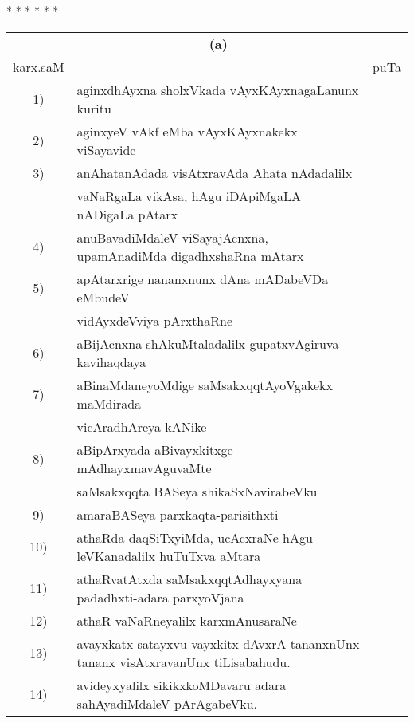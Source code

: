 {\begin{center}
* * * * * *
\end{center}



\begin{longtable}{@{}cp{7.4cm}r}
   &      \multicolumn{1}{c}{\textbf{(a)}} & \\[0.5cm]
karx.saM &                                             & puTa\\[0.5cm]
1) & aginxdhAyxna sholxVkada vAyxKAyxnagaLanunx kuritu & \pageref{page208}\\
2) & aginxyeV vAkf eMba vAyxKAyxnakekx viSayavide & \pageref{page211}\\
3) & anAhatanAdada visAtxravAda Ahata nAdadalilx  & \\
   & vaNaRgaLa vikAsa, hAgu iDApiMgaLA nADigaLa pAtarx & \pageref{page211}\\
4) & anuBavadiMdaleV viSayajAcnxna, upamAnadiMda digadhxshaRna mAtarx & \pageref{page166}\\
5) & apAtarxrige nananxnunx dAna mADabeVDa eMbudeV & \\
   & vidAyxdeVviya pArxthaRne  &  \pageref{page48}\\
6) & aBijAcnxna shAkuMtaladalilx gupatxvAgiruva kavihaqdaya & \pageref{page234}\\  
7) & aBinaMdaneyoMdige saMsakxqqtAyoVgakekx maMdirada & \\
   & vicAradhAreya kANike                   & \pageref{page63}\\
8) & aBipArxyada aBivayxkitxge mAdhayxmavAguvaMte & \\
   & saMsakxqqta BASeya shikaSxNavirabeVku & \pageref{page52}\\
9) & amaraBASeya parxkaqta-parisithxti & \pageref{page25}\\
10) & athaRda daqSiTxyiMda, ucAcxraNe hAgu leVKanadalilx huTuTxva aMtara & \pageref{page180}\\
11) & athaRvatAtxda saMsakxqqtAdhayxyana padadhxti-adara parxyoVjana & \pageref{page4}\\
12) & athaR vaNaRneyalilx karxmAnusaraNe & \pageref{page114}\\
13) & avayxkatx satayxvu vayxkitx dAvxrA tananxnUnx tananx visAtxravanUnx tiLisabahudu. & \pageref{page108}\\
14) & avideyxyalilx sikikxkoMDavaru adara sahAyadiMdaleV pArAgabeVku. &\pageref{page160}\\

\end{longtable}}
